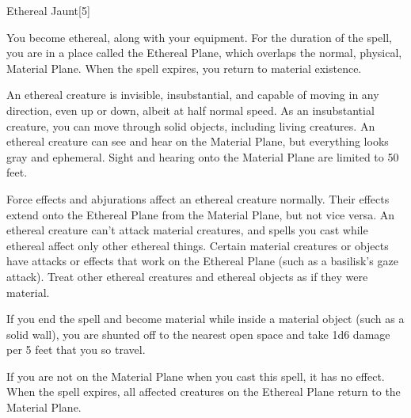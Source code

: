 \begin{spellfooter}
\begin{spellsection}{Ethereal Jaunt}[5]
    \begin{spellheader}
    \end{spellheader}
    \begin{spellcontent}
        \begin{spelltargetinginfo}
        \end{spelltargetinginfo}
        \begin{spelleffects}
            \spelleffect You become ethereal, along with your equipment. For the duration of the spell, you are in a place called the Ethereal Plane, which overlaps the normal, physical, Material Plane. When the spell expires, you return to material existence.
            \par An ethereal creature is invisible, insubstantial, and capable of moving in any direction, even up or down, albeit at half normal speed. As an insubstantial creature, you can move through solid objects, including living creatures. An ethereal creature can see and hear on the Material Plane, but everything looks gray and ephemeral. Sight and hearing onto the Material Plane are limited to 50 feet.
            \par Force effects and abjurations affect an ethereal creature normally. Their effects extend onto the Ethereal Plane from the Material Plane, but not vice versa. An ethereal creature can't attack material creatures, and spells you cast while ethereal affect only other ethereal things. Certain material creatures or objects have attacks or effects that work on the Ethereal Plane (such as a basilisk's gaze attack). Treat other ethereal creatures and ethereal objects as if they were material.
            \par If you end the spell and become material while inside a material object (such as a solid wall), you are shunted off to the nearest open space and take 1d6 damage per 5 feet that you so travel.
            \spelldur \durshort \dismissable
        \end{spelleffects}
    \end{spellcontent}
    \begin{spellfooter}
        \spellnotes If you are not on the Material Plane when you cast this spell, it has no effect. When the spell expires, all affected creatures on the Ethereal Plane return to the Material Plane.
        \miscastexplode
    \end{spellfooter}
    \begin{spellaugments}
    \end{spellaugments}
\end{spellsection}


\end{spellfooter}
